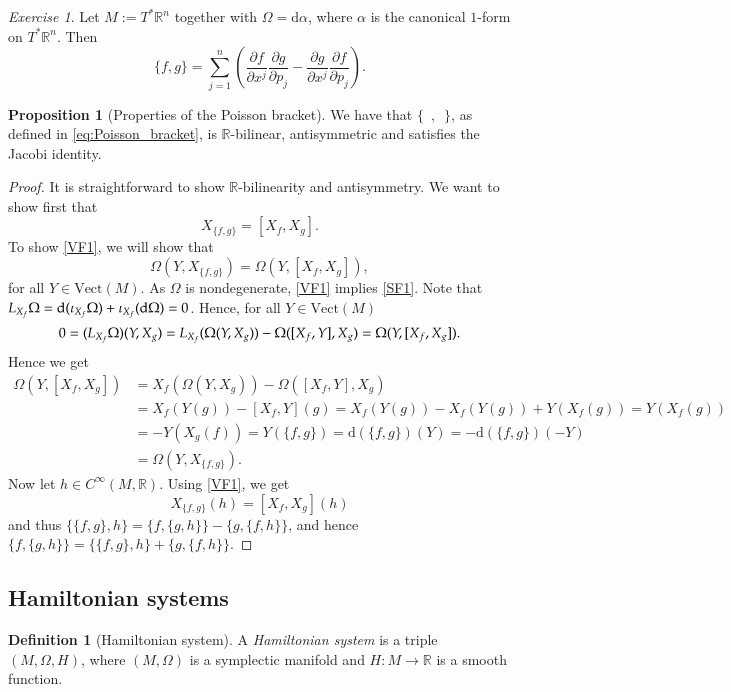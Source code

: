 \documentclass[11pt]{amsart}
\numberwithin{equation}{section}
\theoremstyle{plain}
\theoremstyle{definition}
\newtheorem{defn}{Definition}[subsection]
\newtheorem{prop}{Proposition}[subsection]
\theoremstyle{remark}
\newtheorem{exe}{Exercise}[subsection]
\newcommand{\R}{\mathbb{R}}
\newcommand{\dd}{{\mathrm{d}}}
\begin{document}
\begin{exe}
Let $M:=T^*\R^n$ together with $\Omega=\dd\alpha$, where $\alpha$ is the canonical $1$-form on $T^*\R^n$. Then 
\begin{equation}
\label{eq:Poisson_bracket}
\{f,g\}=\sum_{j=1}^n\left(\frac{\partial f}{\partial x^j}\frac{\partial g}{\partial p_j}-\frac{\partial g}{\partial x^j}\frac{\partial f}{\partial p_j}\right).
\end{equation}
\end{exe}

\begin{prop}[Properties of the Poisson bracket]
We have that $\{\enspace,\enspace\}$, as defined in \eqref{eq:Poisson_bracket}, is $\R$-bilinear, antisymmetric and satisfies the Jacobi identity.
\end{prop}

\begin{proof}
It is straightforward to show $\R$-bilinearity and antisymmetry. We want to show first that 
\begin{equation}
\label{VF1}
X_{\{f,g\}}=[X_f,X_g].
\end{equation}
To show \eqref{VF1}, we will show that 
\begin{equation}
\label{SF1}
\Omega(Y,X_{\{f,g\}})=\Omega(Y,[X_f,X_g]),
\end{equation}
for all $Y\in \mathrm{Vect}(M)$. As $\Omega$ is nondegenerate, \eqref{VF1} implies \eqref{SF1}. Note that $\emph{L}_{X_f}\Omega=\dd(\iota_{X_f}\Omega)+\iota_{X_f}(\dd\Omega)=0$. Hence, for all $Y\in \mathrm{Vect}(M)$
\[
0=(\emph{L}_{X_f}\Omega)(Y,X_g)=\emph{L}_{X_f}(\Omega(Y,X_g))-\Omega([X_f,Y],X_g)=\Omega(Y,[X_f,X_g]).
\]
Hence we get 
\begin{align*}
\Omega(Y,[X_f,X_g])&=X_f(\Omega(Y,X_g))-\Omega([X_f,Y],X_g)\\
&=X_f(Y(g))-[X_f,Y](g)=X_f(Y(g))-X_f(Y(g))+Y(X_f(g))=Y(X_f(g))\\
&=-Y(X_g(f))=Y(\{f,g\})=\dd(\{f,g\})(Y)=-\dd(\{f,g\})(-Y)\\
&=\Omega(Y,X_{\{f,g\}}).
\end{align*}
Now let $h\in C^\infty(M,\R)$. Using \eqref{VF1}, we get 
\[
X_{\{f,g\}}(h)=[X_f,X_g](h)
\]
and thus $\{\{f,g\},h\}=\{f,\{g,h\}\}-\{g,\{f,h\}\}$, and hence $\{f,\{g,h\}\}=\{\{f,g\},h\}+\{g,\{f,h\}\}$.
\end{proof}

\subsection{Hamiltonian systems}
\begin{defn}[Hamiltonian system]
A \emph{Hamiltonian system} is a triple $(M,\Omega, H)$, where $(M,\Omega)$ is a symplectic manifold and $H\colon M\to\R$ is a smooth function.
\end{defn}
\end{document}
